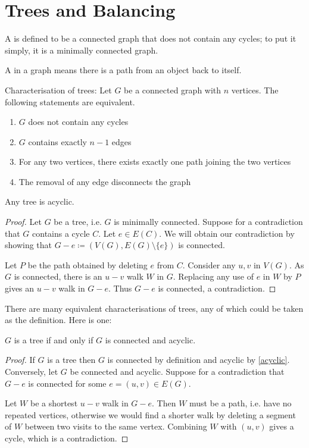 \section{Trees and Balancing}
A  is defined to be a connected graph that does not contain any cycles; to put it simply, it is a minimally connected graph.

A  in a graph means there is a path from an object back to itself.

Characterisation of trees: Let $G$ be a connected graph with $n$ vertices. The following statements are equivalent.
\begin{enumerate}
\item $G$ does not contain any cycles
\item $G$ contains exactly $n-1$ edges
\item For any two vertices, there exists exactly one path joining the two vertices
\item The removal of any edge disconnects the graph
\end{enumerate}

\begin{lemma}\label{acyclic}
Any tree is acyclic.
\end{lemma}
\begin{proof}
Let $G$ be a tree, i.e. $G$ is minimally connected. Suppose for a contradiction that $G$ contains a cycle $C$. Let $e \in E(C)$. We will obtain our contradiction by showing that $G-e \coloneqq (V(G),E(G)\setminus\{e\})$ is connected. 

Let $P$ be the path obtained by deleting $e$ from $C$. Consider any $u,v$ in $V(G)$. As $G$ is connected, there is an $u-v$ walk $W$ in $G$. Replacing any use of $e$ in $W$ by $P$ gives an $u-v$ walk in $G-e$. Thus $G-e$ is connected, a contradiction.
\end{proof}

There are many equivalent characterisations of trees, any of which could be taken as the definition. Here is one:

\begin{lemma}\label{tree_iff}
$G$ is a tree if and only if $G$ is connected and acyclic.
\end{lemma}
\begin{proof}
If $G$ is a tree then $G$ is connected by definition and acyclic by \cref{acyclic}. Conversely, let $G$ be connected and acyclic. Suppose for a contradiction that $G-e$ is connected for some $e = (u,v) \in E(G)$.

Let $W$ be a shortest $u-v$ walk in $G-e$. Then $W$ must be a path, i.e. have no repeated vertices, otherwise we would find a shorter walk by deleting a segment of $W$ between two visits to the same vertex. Combining $W$ with $(u,v)$ gives a cycle, which is a contradiction.
\end{proof}

